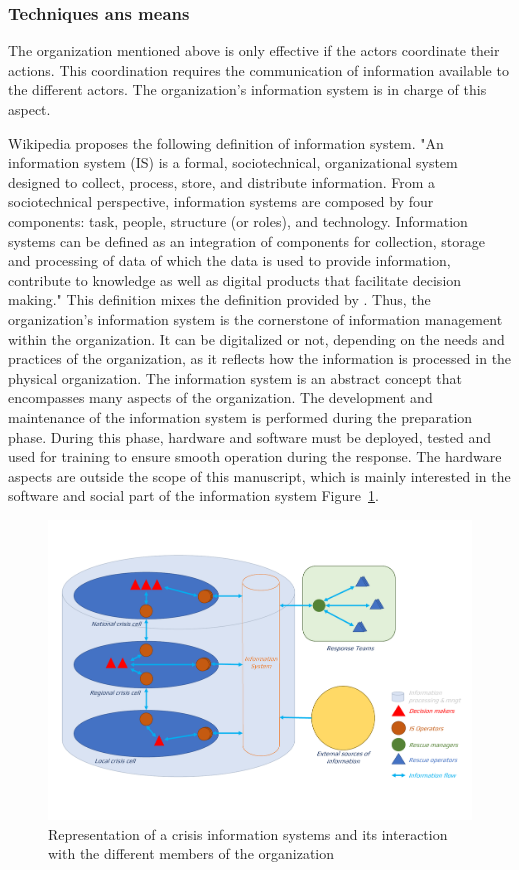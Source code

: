 \subsubsection{Techniques ans means}
The organization mentioned above is only effective if the actors coordinate their actions.
This coordination requires the communication of information available to the different actors.
The organization's information system is in charge of this aspect.

Wikipedia \cite{InformationSystem2021} proposes the following definition of information system.
"An information system (IS) is a formal, sociotechnical, organizational system designed to collect, process, store, and distribute information.
From a sociotechnical perspective, information systems are composed by four components: task, people, structure (or roles), and technology.
Information systems can be defined as an integration of components for collection, storage and processing of data of which the data is used
to provide information, contribute to knowledge as well as digital products that facilitate decision making."
This definition mixes the definition provided by \cite{oharaManagingThreeLevels1999,piccoliInformationSystemsManagers2019,zwassInformationSystemDefinition}.
Thus, the organization's information system is the cornerstone of information management within the organization.
It can be digitalized or not, depending on the needs and practices of the organization, as it reflects how the information is processed in the physical organization.
The information system is an abstract concept that encompasses many aspects of the organization.
The development and maintenance of the information system is performed during the preparation phase.
During this phase, hardware and software must be deployed, tested and used for training to ensure smooth operation during the response.
The hardware aspects are outside the scope of this manuscript, which is mainly interested in the software and social part of the information system Figure~\ref{context:information-system}.
\begin{figure}
    \centering
    \includegraphics[width=\textwidth]{figures/information-system.pdf}
    \caption{Representation of a crisis information systems and its interaction with the different members of the organization}
    \label{context:information-system}
\end{figure}
